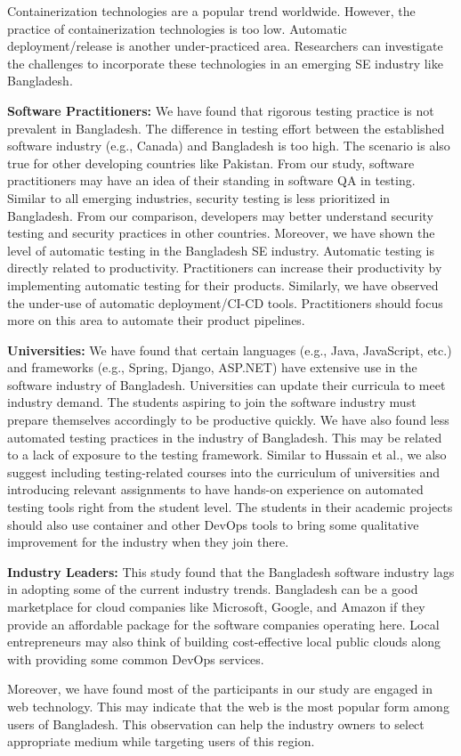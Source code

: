 Containerization technologies are a popular trend worldwide. However, the practice of containerization technologies is too low. Automatic deployment/release is another under-practiced area. Researchers can investigate the challenges to incorporate these technologies in an emerging SE industry like Bangladesh.

\indent \textbf{Software Practitioners:} We have found that rigorous testing practice is not prevalent in Bangladesh. The difference in testing effort between the established software industry (e.g., Canada) and Bangladesh is too high. The scenario is also true for other developing countries like Pakistan. From our study, software practitioners may have an idea of their standing in software QA in testing. Similar to all emerging industries, security testing is less prioritized in Bangladesh. From our comparison, developers may better understand security testing and security practices in other countries. Moreover, we have shown the level of automatic testing in the Bangladesh SE industry. Automatic testing is directly related to productivity. Practitioners can increase their productivity by implementing automatic testing for their products. Similarly, we have observed the under-use of automatic deployment/CI-CD tools. Practitioners should focus more on this area to automate their product pipelines.

\indent \textbf{Universities:} We have found that certain languages (e.g., Java, JavaScript, etc.) and frameworks (e.g., Spring, Django, ASP.NET) have extensive use in the software industry of Bangladesh. Universities can update their curricula to meet industry demand. The students aspiring to join the software industry must prepare themselves accordingly to be productive quickly. We have also found less automated testing practices in the industry of Bangladesh. This may be related to a lack of exposure to the testing framework. Similar to Hussain et al.\citep{Hussain2020}, we also suggest including testing-related courses into the curriculum of universities and introducing relevant assignments to have hands-on experience on automated testing tools right from the student level. The students in their academic projects should also use container and other DevOps tools to bring some qualitative improvement for the industry when they join there.


\indent \textbf{Industry Leaders:} This study found that the Bangladesh software industry lags in adopting some of the current industry trends. Bangladesh can be a good marketplace for cloud companies like Microsoft, Google, and Amazon if they provide an affordable package for the software companies operating here. Local entrepreneurs may also think of building cost-effective local public clouds along with providing some common DevOps services.  

Moreover, we have found most of the participants in our study are engaged in web technology. This may indicate that the web is the most popular form among users of Bangladesh. This observation can help the industry owners to select appropriate medium while targeting users of this region. %
